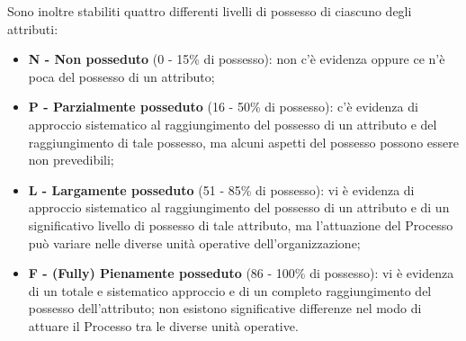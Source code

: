 Sono inoltre stabiliti quattro differenti livelli di possesso di ciascuno degli attributi:\\
\begin{itemize}
\item \textbf{N - Non posseduto} (0 - 15\% di possesso): non c’è evidenza oppure ce n’è poca del possesso di un attributo;
\item \textbf{P - Parzialmente posseduto} (16 - 50\% di possesso): c’è evidenza di approccio sistematico al raggiungimento del possesso di un attributo e del raggiungimento di tale possesso, ma alcuni aspetti del possesso possono essere non prevedibili;
\item \textbf{L - Largamente posseduto} (51 - 85\% di possesso): vi è evidenza di approccio sistematico al raggiungimento del possesso di un attributo e di un significativo livello di possesso di tale attributo, ma l’attuazione del Processo può variare nelle diverse unità operative dell'organizzazione;
\item \textbf{F - (Fully) Pienamente posseduto} (86 - 100\% di possesso): vi è evidenza di un totale e sistematico approccio e di un completo raggiungimento del possesso dell’attributo; non esistono significative differenze nel modo di attuare il Processo tra le diverse unità operative.
\end{itemize}

